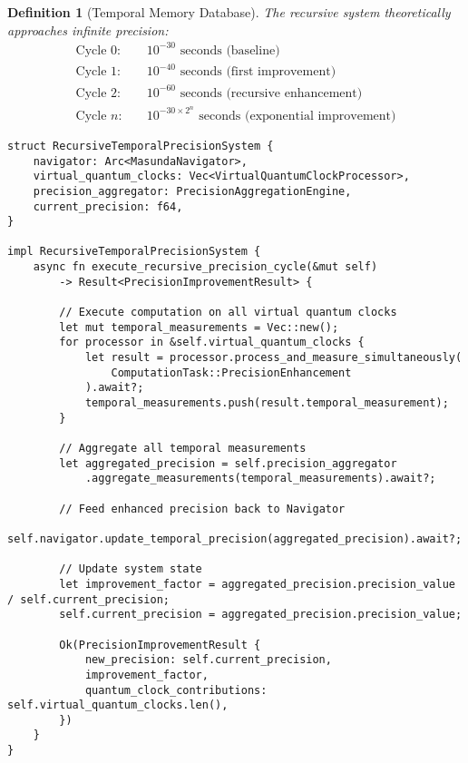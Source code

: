 \documentclass[12pt]{article}
\newtheorem{definition}[theorem]{Definition}
\begin{document}
\begin{definition}[Temporal Memory Database]
The recursive system theoretically approaches infinite precision:
\begin{align}
\text{Cycle 0:} \quad &10^{-30} \text{ seconds (baseline)} \\
\text{Cycle 1:} \quad &10^{-40} \text{ seconds (first improvement)} \\
\text{Cycle 2:} \quad &10^{-60} \text{ seconds (recursive enhancement)} \\
\text{Cycle } n: \quad &10^{-30 \times 2^n} \text{ seconds (exponential improvement)}
\end{align}

\begin{lstlisting}[caption=Recursive Precision Enhancement System]
struct RecursiveTemporalPrecisionSystem {
    navigator: Arc<MasundaNavigator>,
    virtual_quantum_clocks: Vec<VirtualQuantumClockProcessor>,
    precision_aggregator: PrecisionAggregationEngine,
    current_precision: f64,
}

impl RecursiveTemporalPrecisionSystem {
    async fn execute_recursive_precision_cycle(&mut self) 
        -> Result<PrecisionImprovementResult> {
        
        // Execute computation on all virtual quantum clocks
        let mut temporal_measurements = Vec::new();
        for processor in &self.virtual_quantum_clocks {
            let result = processor.process_and_measure_simultaneously(
                ComputationTask::PrecisionEnhancement
            ).await?;
            temporal_measurements.push(result.temporal_measurement);
        }
        
        // Aggregate all temporal measurements
        let aggregated_precision = self.precision_aggregator
            .aggregate_measurements(temporal_measurements).await?;
        
        // Feed enhanced precision back to Navigator
        self.navigator.update_temporal_precision(aggregated_precision).await?;
        
        // Update system state
        let improvement_factor = aggregated_precision.precision_value / self.current_precision;
        self.current_precision = aggregated_precision.precision_value;
        
        Ok(PrecisionImprovementResult {
            new_precision: self.current_precision,
            improvement_factor,
            quantum_clock_contributions: self.virtual_quantum_clocks.len(),
        })
    }
}
\end{lstlisting}


\end{definition}
\end{document}
